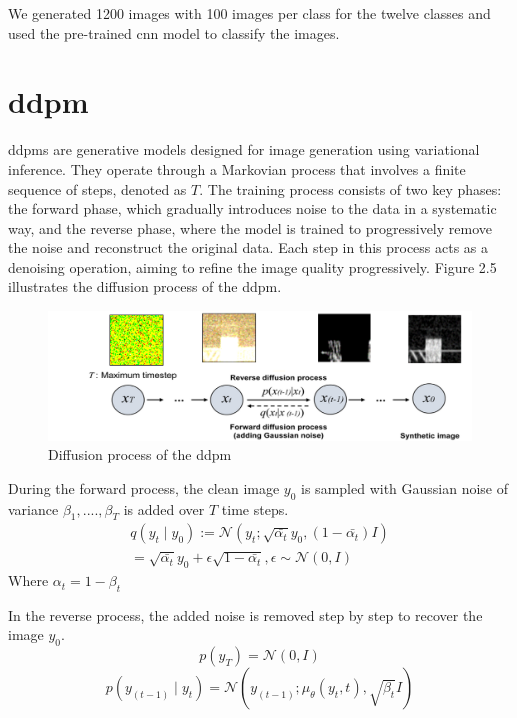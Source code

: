 We generated 1200 images with 100 images per class for the twelve classes and used the pre-trained \gls{cnn} model to classify the images. 

\section{\gls{ddpm}}

\gls{ddpm}s are generative models designed for image generation using variational inference. They operate through a Markovian process that involves a finite sequence of steps, denoted as $T$.
The training process consists of two key phases: the forward phase, which gradually introduces noise to the data in a systematic way, and the reverse phase, where the model is trained to progressively remove the noise and reconstruct the original data.
Each step in this process acts as a denoising operation, aiming to refine the image quality progressively\cite{7}. Figure 2.5 illustrates the diffusion process of the \gls{ddpm}. 

\begin{figure}[h]
\includegraphics[width=\textwidth]{figures/ddpm.png}
\centering
\caption{ Diffusion process of the \gls{ddpm}}
\centering
\end{figure}

During the forward process, the clean image $y_0$ is sampled with Gaussian noise of variance ${\beta_1,....,\beta_T}$ is added over $T$ time steps.
\begin{equation}
\begin{split}
    q(y_t\mid y_0) :=\mathcal{N}(y_t;\sqrt{\bar{\alpha_t}}y_0,(1-\bar{\alpha_t})I)\\
    =\sqrt{\bar{\alpha_t}}y_0+\epsilon\sqrt{1-\bar{\alpha_t}},\epsilon \sim \mathcal{N}(0,I)
    \end{split}
\end{equation}
Where $\alpha_t=1-\beta_t$

In the reverse process, the added noise is removed step by step to recover the image $y_0$.
\begin{equation}
    p(y_T)=\mathcal{N}(0,I)
\end{equation}
\begin{equation}
    p(y_{(t-1)}\mid y_t)=\mathcal{N}(y_{(t-1)};\mu_{\theta}(y_t,t),\sqrt{\beta_t}I)
\end{equation}

